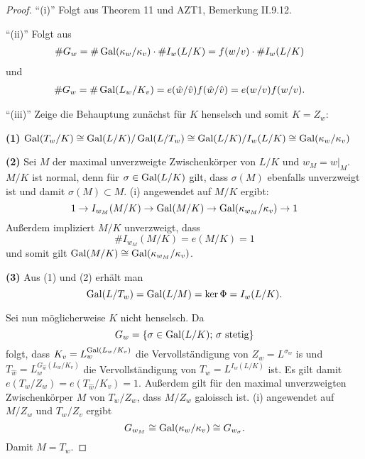 \begin{proof}
	\enquote{(i)} Folgt aus Theorem 11 und AZT1, Bemerkung II.9.12.
	
	\bigskip \enquote{(ii)} Folgt aus
	\begin{align*}
	\# G_w
	&= \# \operatorname{Gal}(\kappa_w / \kappa_v) \cdot \# I_w(L/K)
	=f(w/v) \cdot \#I_w(L/K)
	\end{align*}
	und
	\begin{align*}
	\# G_w
	&= \# \operatorname{Gal}(L_w / K_v) 
	= e(\hat{w}/\hat{v}) f(\hat{w}/\hat{v}) 
	= e(w/v) f(w/v). 
	\end{align*}
	
	\bigskip \enquote{(iii)} Zeige die Behauptung zunächst für $K$ henselsch und somit $K=Z_w$:
	
	\bigskip \textbf{(1)} $ \operatorname{Gal}(T_w/K) \cong \operatorname{Gal}(L/K) / \operatorname{Gal}(L/T_w)
	 \cong \operatorname{Gal}(L/K) / I_w(L/K) \cong \operatorname{Gal}(\kappa_w/\kappa_v)$
	
	\bigskip \textbf{(2)} Sei $M$ der maximal unverzweigte Zwischenkörper von $L/K$ und $w_M=w|_M$. $M/K$ ist normal, denn für $\sigma\in\operatorname{Gal}(L/K)$ gilt, dass $\sigma(M)$ ebenfalls unverzweigt ist und damit $\sigma(M)\subset M$. (i) angewendet auf $M/K$ ergibt:
	\[ 1 \to I_{w_M}(M/K) \to \operatorname{Gal}(M/K) \to \operatorname{Gal}(\kappa_{w_M} / \kappa_v) \to 1
	\]
	Außerdem impliziert $M/K$ unverzweigt, dass
	\[ \# I_{w_M}(M/K) = e(M/K) =1
	\]
	und somit gilt $\operatorname{Gal}(M/K) \cong \operatorname{Gal} (\kappa_{w_M} / \kappa_v)$.
	
	\bigskip \textbf{(3)} Aus (1) und (2) erhält man
	\[ \operatorname{Gal}(L/T_w)=\operatorname{Gal}(L/M)= \ker \Phi = I_w(L/K).
	\]
	
	\bigskip Sei nun möglicherweise $K$ nicht henselsch.
	Da
	\[ G_w = \{ \sigma \in \operatorname{Gal}(L/K); \, \sigma \text{ stetig} \}
	\]
	folgt, dass $ K_v = L_w^{\operatorname{Gal}(L_w/K_v)} $ die Vervollständigung von $Z_w = L^{\sigma_w}$ is und $T_{\hat{w}} = L_w^{G_{\hat{w}}(L_w/K_v)}$ die Vervollständigung von $T_w = L^{I_w(L/K)}$ ist.
	Es gilt damit $e(T_w/Z_w)=e(T_{\hat{w}}/K_v) =1$. Außerdem gilt für den maximal unverzweigten Zwischenkörper $M$ von $T_w/Z_w$, dass $M/Z_w$ galoissch ist.
	(i) angewendet auf $M/Z_w$ und $T_w/Z_v$ ergibt
	\[ G_{w_M} \cong \operatorname{Gal}(\kappa_w/\kappa_v) \cong G_{w_\sigma}.
	\]
	Damit $M= T_w$.
\end{proof}












